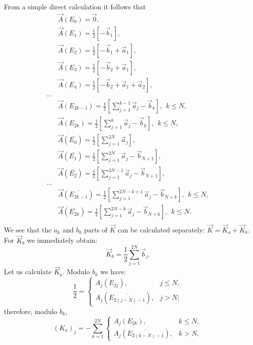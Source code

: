 \documentclass[12pt]{article}
\begin{document}
From a simple direct calculation it follows that 
\begin{equation}
\label{eq:abel_bp}
\begin{split}
&\vec A(E_{0}) = \vec 0,\\
&\vec A(E_{1}) = \frac{1}{2}\left[ -\vec b_1 \right],\\
&\vec A(E_{2}) = \frac{1}{2}\left[ -\vec b_1 +\vec a_1 \right],\\
&\vec A(E_{3}) = \frac{1}{2}\left[ -\vec b_2 +\vec a_1  \right],\\
&\vec A(E_{4}) = \frac{1}{2}\left[ -\vec b_2 +\vec a_1 + \vec a_2 \right],\\
\ldots\\
&\vec A(E_{2k-1}) = \frac{1}{2}\left[\sum\limits_{j=1}^{k-1} \vec a_j -\vec b_k  \right],\ \ k\le N, \\
&\vec A(E_{2k}) = \frac{1}{2}\left[\sum\limits_{j=1}^{k} \vec a_j - \vec b_k \right], \ \ k\le N,\\
&\vec A(\overline{E_{0}}) =\frac{1}{2}\left[\sum\limits_{j=1}^{2N} \vec a_j  \right] ,\\
&\vec A(\overline{E_{1}}) = \frac{1}{2}\left[\sum\limits_{j=1}^{2N} \vec a_j   - \vec b_{N+1}\right],\\
&\vec A(\overline{E_{2}}) = \frac{1}{2}\left[\sum\limits_{j=1}^{2N-1} \vec a_j   - \vec b_{N+1}\right],\\
\ldots\\
&\vec A(\overline{E_{2k-1}}) = \frac{1}{2}\left[\sum\limits_{j=1}^{2N-k+1} \vec a_j -\vec b_{N+k}  \right],\ \ k\le N, \\
&\vec A(\overline{E_{2k}}) = \frac{1}{2}\left[\sum\limits_{j=1}^{2N-k} \vec a_j - \vec b_{N+k} \right], \ \ k\le N.\\
\end{split}
\end{equation}
We see that the $a_k$ and $b_k$ parts of $\vec K$ can be calculated separately: $\vec K = \vec K_a + \vec K_b$. 
For $\vec K_b$ we immediately obtain:
$$
\vec K_b = \frac{1}{2}\sum\limits_{j=1}^{2N} \vec b_j.
$$
Let us calculate $\vec K_a$. Modulo $b_k$ we have:
$$
\frac{1}{2} = \left\{\begin{array}{ll}  A_j(E_{2j}), & j \le N ,  \\   A_j(\overline{E_{2(j-N)-1}}), & j>N; 
\end{array}\right.
$$
therefore, modulo $b_k$, 
$$
(K_a)_j = - \sum_{ k=1 }^{2N} \left\{\begin{array}{ll} A_j(E_{2k}), & k\le N ,\\
 A_j(\overline{E_{2(k-N)-1}} ), & k > N,  \end{array} \right.
$$
\end{document}
